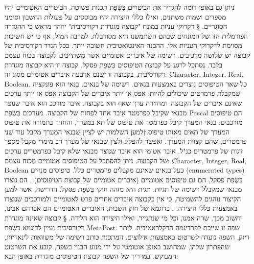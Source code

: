 {ניתן גם באופן דומה להגדיר את הביטויים בִּשְׂפַת תכנות פשוטה. הביטויים האטומיים יהיו מספרים ושמות משתנים, ואילו כללי היצירה יהיו מבוססים על פעולות החשבון וסימני הסוגריים.
§ דקדוקי עניות במונח "קבוצה מוגדרת רקורסיבית"
יוזהר מראש כי ההגדרה הפורמלית הזו של המונחים שבהם השתמשנו היא מסורבלת. למרבה המזל, אף כי יש חשיבות מסוימת לדקדוקי העניות אלו, ההבנה האינטואטיבית חשובה יותר.
בכל הגדר רקורסיבית של קבוצה יש שלושה מרכיבים.
רשימה של איברים אטומיים אשר משתייכים לקבוצה בכוח עצמם בלבד.
נסתכל לרגע על קבוצת הטיפוסים בִּשְׂפַת פסקל. קבוצה זו היא קבוצה מוגדרת רקורסיבית, בקבוצה זו ישנם ארבעה איברים אטומיים מסוג זה: Character, Integer, Real, Boolean. כל שאר הטיפוסים נוצרים באמצעות בנאים.
רשימה של בנאים.
בנאי הוא פונקציה שמקבלת פרמרטים שיכולים להיות:
אפס או יותר איברים של הקבוצה
אפס או יותר ערכים שאינם איברים של הקבוצה.
ומחזירה ערך שאף הוא בקבוצה.
איבר מורכב הוא איבר שנוצר מבנאי שקיבל כפרמטר איבר אחד לפחות של הקבוצה.
מערכים בִּשְׂפַת Pascal הם טיפוסים מורכבים: בנאי המערך קיבל כפרמטר את טיפוס של תא במערך, והחזיר בתמורה את טיפוס המערך של תאים מאותו טיפוס.†{למען השלמות יש לציין שבנאי המערך מקבל עוד שני פרמטרים, שהם קצוות המערך. ואפשר להפליג ולצין שבנאי של מערך רב מימדי מקבל מספר זוגות של פרמטרים כנ"ל.}
איבר אטומי הוא איבר שנוצר מבנאי שלא קיבל כפרמטרים ערכים של הקבוצה.
ניתן להסתכל על הטיפוסים אטומיים מכוח עצמם: Character, Integer, Real, Boolean כעל בנאים שאינם מקבלים פרמטרים כלל.
טיפוסים מנויים (enumerated types) בִּשְׂפַת פסקל, הם גם טיפוסים אטומיים (איברים אטומיים של קבוצת הטיפוסים) . הם נוצרו מבנאי שמקבלל רשימה של תגיות. תגית היא מזהה חוקי בִּשְׂפַת פסקל.
הדרישה, אשר למען הקיצור נוהגים להשמיטה, כי אין בקבוצה איברים אחרים פרט לאטומיים ולמורכבים שנוצרו באמצעות כללי היצירה. .
בדוגמא של חוק השבות, האיברים האטומיים הם אברהם אבינו, וחשוב מכך, שרה אמנו, וכל מי שנתגייר, ואילו היצירה הוא הלידה.
§ קבוצה שאינה מוגדרת רקורסיבית
נעיין לדוגמא בִּשְׂפַת MetaPost. שפה זו שייכת לפרדיגמה הדקלראטיבית. ליתר דיוק, השפה נועדה לשרטוט באמצעות אילוצים. המתכנת כותב רשימה של משוואות לינאריות, שהפתרון שלהן, שמחושב באופן אוטומטי על ידי מנוע הבנוי בשפה, קובע את השרטוט המבוקש.
במדריך של השפה קבוצת הטיפוסים מוגדרת באופן הבא:

}

